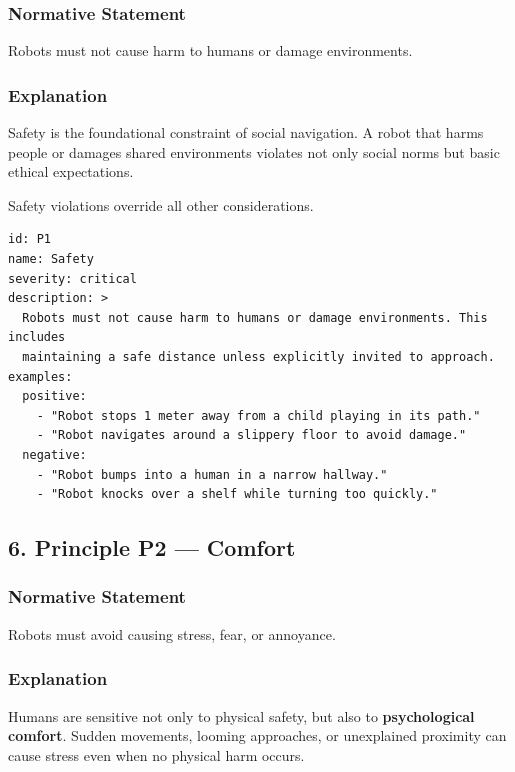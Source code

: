 \documentclass[utf8]{frontiers_suppmat} %
\begin{document}
\subsubsection{Normative Statement}\label{normative-statement-1}

Robots must not cause harm to humans or damage environments.

\subsubsection{Explanation}\label{explanation-1}

Safety is the foundational constraint of social navigation. A robot that
harms people or damages shared environments violates not only social
norms but basic ethical expectations.

Safety violations override all other considerations.

\begin{lstlisting}[style=literatecard, label={principle:p1}]
id: P1
name: Safety
severity: critical
description: >
  Robots must not cause harm to humans or damage environments. This includes
  maintaining a safe distance unless explicitly invited to approach.
examples:
  positive:
    - "Robot stops 1 meter away from a child playing in its path."
    - "Robot navigates around a slippery floor to avoid damage."
  negative:
    - "Robot bumps into a human in a narrow hallway."
    - "Robot knocks over a shelf while turning too quickly."
\end{lstlisting}

\subsection{6. Principle P2 --- Comfort}\label{principle-p2-comfort}

\subsubsection{Normative Statement}\label{normative-statement-2}

Robots must avoid causing stress, fear, or annoyance.

\subsubsection{Explanation}\label{explanation-2}

Humans are sensitive not only to physical safety, but also to
\textbf{psychological comfort}. Sudden movements, looming approaches, or
unexplained proximity can cause stress even when no physical harm
occurs.
\end{document}

